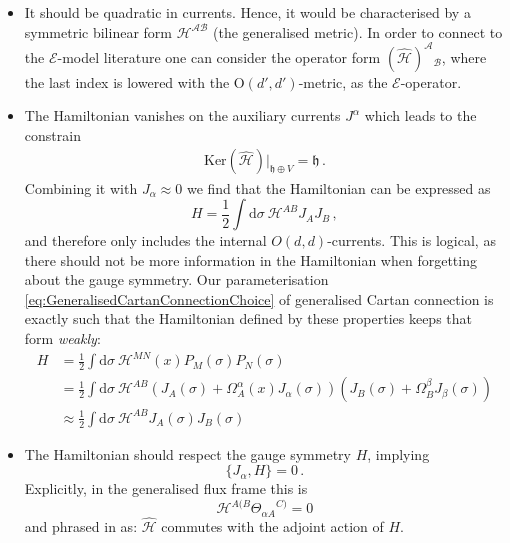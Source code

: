 \documentclass[11pt,a4paper]{article}
\numberwithin{equation}{section}
\begin{document}
\begin{itemize}
	\item It should be quadratic in currents. Hence, it would be characterised by a symmetric bilinear form $\mathcal{H}^{\mathcal{A}\mathcal{B}}$ (the generalised metric). In order to connect to the $\mathcal{E}$-model literature one can consider the operator form $(\hat{\mathcal{H}})^\mathcal{A}{}_\mathcal{B}$, where the last index is lowered with the O$(d',d')$-metric, as the $\mathcal{E}$-operator.
	
	\item The Hamiltonian vanishes on the auxiliary currents $J^\alpha$ which leads to the constrain \cite{Lacroix:2023ybi}
		\begin{align*}
			\text{Ker}(\hat{\mathcal{H}})\vert_{\mathfrak{h} \oplus V} = \mathfrak{h}\,.
		\end{align*}
Combining it with $J_\alpha \approx 0$ we find that the Hamiltonian can be expressed as
\begin{equation}
	H = \frac{1}{2} \int \mathrm{d} \sigma \ \mathcal{H}^{AB} J_A J_B\,,
\end{equation}
and therefore only includes the internal $O(d,d)$-currents. This is logical, as there should not be more information in the Hamiltonian when forgetting about the gauge symmetry. Our parameterisation \eqref{eq:GeneralisedCartanConnectionChoice} of generalised Cartan connection is exactly such that the Hamiltonian defined by these properties keeps that form \textit{weakly}:
\begin{align}
H &= \frac{1}{2} \int \mathrm{d}\sigma \ \mathcal{H}^{MN}(x) P_M (\sigma) P_N(\sigma) \nonumber \\
&= \frac{1}{2} \int \mathrm{d}\sigma \ \mathcal{H}^{AB} (J_A (\sigma)+ \Omega_A^\alpha(x) J_\alpha (\sigma) ) ( J_B (\sigma)+ \Omega_B^\beta J_\beta (\sigma)) \nonumber \\ 
&\approx \frac{1}{2} \int \mathrm{d} \sigma \ \mathcal{H}^{AB} J_A (\sigma) J_B(\sigma) \nonumber
\end{align}		
		
	\item The Hamiltonian should respect the gauge symmetry $H$, implying
	\begin{equation}
		\{J_\alpha , H \} = 0\,.
	\end{equation}
	Explicitly, in the generalised flux frame this is
	\begin{equation}\label{eq:mathcalHinv}
		\mathcal{H}^{A(B} {\Theta_{\alpha A}}^{C)} = 0
	\end{equation}
	and phrased in \cite{Lacroix:2023ybi} as: $\hat{\mathcal{H}}$ commutes with the adjoint action of $H$.
	

\end{itemize}
\end{document}
